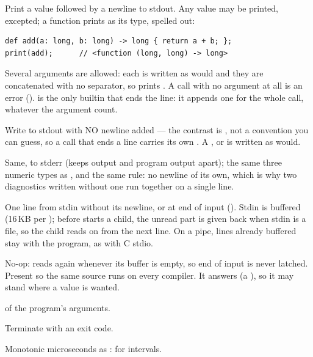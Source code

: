 \begin{description}[style=nextline,leftmargin=5.2em]
\item[\ic{print(x)}] Print a value followed by a newline to stdout. Any
  value may be printed,  excepted; a function prints as its
  type, spelled out:

\begin{lstlisting}
def add(a: long, b: long) -> long { return a + b; };
print(add);      // <function (long, long) -> long>
\end{lstlisting}
\item[\ic{print(a, b, ...)}] Several arguments are allowed: each is
  written as  would and they are concatenated with no
  separator, so  prints . A call with
  no argument at all is an error ().
   is the only builtin that ends the line: it appends one
   for the whole call, whatever the argument count.
\item[\ic{puts(s)}] Write to stdout with NO newline added --- the
  contrast is , not a convention you can guess, so a call that
  ends a line carries its own . A ,
   or  is written as  would.
\item[\ic{eputs(s)}] Same, to stderr (keeps  output and
  program output apart); the same three numeric types as , and
  the same rule: no newline of its own, which is why two diagnostics
  written without one run together on a single line.
\item[\ic{readline()}] One line from stdin without its newline, or
   at end of input (). Stdin is buffered (16\,KB per
  ); before  starts a child, the unread part is
  given back when stdin is a file, so the child reads on from the next
  line. On a pipe, lines already buffered stay with the program, as with
  C stdio.
\item[\ic{clear\_eof()}] No-op:  reads again whenever
  its buffer is empty, so end of input is never latched. Present so the
  same source runs on every compiler. It answers  (a ),
  so it may stand where a value is wanted.
\item[\ic{argv()}] \ic{[str]} of the program's arguments.
\item[\ic{exit(code)}] Terminate with an exit code.
\item[\ic{clock\_us()}] Monotonic microseconds as : for
  intervals.

\end{description}
